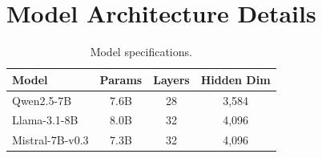 \documentclass[11pt]{article}
\theoremstyle{definition}
\begin{document}
\section{Model Architecture Details}

\begin{table}[ht]
\centering
\caption{Model specifications.}
\label{tab:models}
\begin{tabular}{lccc}
\toprule
\textbf{Model} & \textbf{Params} & \textbf{Layers} & \textbf{Hidden Dim} \\
\midrule
Qwen2.5-7B & 7.6B & 28 & 3,584 \\
Llama-3.1-8B & 8.0B & 32 & 4,096 \\
Mistral-7B-v0.3 & 7.3B & 32 & 4,096 \\
\bottomrule
\end{tabular}
\end{table}
\end{document}
